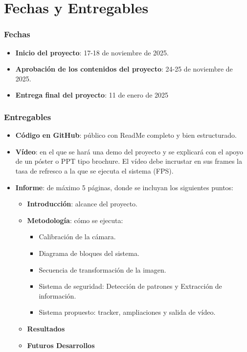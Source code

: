 \chapter{\textbf{Fechas y Entregables}}
\label{chapter:fechas_entregables}

\subsection*{Fechas}
{}
\vspace{5mm}

\begin{itemize}
    \item \textbf{Inicio del proyecto}: 17-18 de noviembre de 2025.
    \item \textbf{Aprobación de los contenidos del proyecto}: 24-25 de noviembre de 2025.
    \item \textbf{Entrega final del proyecto}: 11 de enero de 2025
\end{itemize}

\subsection*{Entregables}
{}
\vspace{5mm}

\begin{itemize}
    \item \textbf{Código en GitHub}: público con ReadMe completo y bien estructurado.
    \item \textbf{Vídeo}: en el que se hará una demo del proyecto y se explicará con el apoyo de un póster o PPT tipo brochure. El vídeo debe incrustar en sus frames la tasa de refresco a la que se ejecuta el sistema (FPS).
    \item \textbf{Informe}: de máximo 5 páginas, donde se incluyan los siguientes puntos:
    \begin{itemize}
        \item \textbf{Introducción}: alcance del proyecto.
        \item \textbf{Metodología}: cómo se ejecuta:
        \begin{itemize}
            \item Calibración de la cámara.
            \item Diagrama de bloques del sistema.
            \item Secuencia de transformación de la imagen.
            \item Sistema de seguridad: Detección de patrones y Extracción de información.
            \item Sistema propuesto: tracker, ampliaciones y salida de vídeo.
        \end{itemize}
        \item \textbf{Resultados}
        \item \textbf{Futuros Desarrollos}
    \end{itemize}
\end{itemize}